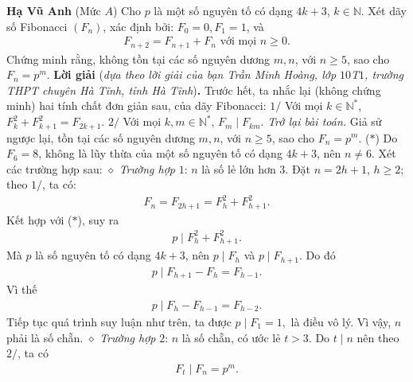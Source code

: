 \begin{multicols}{2}
	\vskip 0.2cm
	\hfill	\textbf{\color{thachthuctoanhoc}Hạ Vũ Anh}
	\vskip 0.2cm
	{}
	(Mức $A$)
	Cho $p$ là một số nguyên tố có dạng $4k + 3$, $k \in \mathbb{N}$. Xét dãy số Fibonacci $(F_n)$, xác định bởi: $F_0 = 0, F_1 = 1$,    và
	\begin{align*}
		{F_{n + 2}} = {F_{n + 1}} + {F_n}	\text{ với mọi } n \ge 0.
	\end{align*}
	Chứng minh rằng, không tồn tại các số nguyên dương $m, n$, với $n \ge 5$, sao cho \linebreak $F_n = p^m$.
	\vskip 0.05cm
	\textbf{\color{thachthuctoanhoc}Lời giải} (\textit{dựa theo lời giải của bạn Trần Minh Hoàng, lớp $10$T$1$, trường THPT chuyên Hà Tĩnh, tỉnh Hà Tĩnh})\textbf{\color{thachthuctoanhoc}.}
	\vskip 0.05cm
	Trước hết, ta nhắc lại (không chứng minh) hai tính chất đơn giản sau, của dãy Fibonacci:
	\vskip 0.05cm
	$1/$ Với mọi  $k \in \mathbb{N^*}$, $F_k^2 + F_{k + 1}^2 = {F_{2k + 1}}.$
	\vskip 0.05cm
	$2/$ Với mọi $k, m \in \mathbb{N^*}$, ${F_m}\mid{F_{km}}.$
	\vskip 0.05cm
	\textit{Trở lại bài toán.}
	\vskip 0.05cm
	Giả sử ngược lại, tồn tại các số nguyên dương $m, n$, với $n \ge 5$, sao cho  $F_n = p^m$. \hfill ($*$)
	\vskip 0.05cm
	Do $F_6 = 8$, không là lũy thừa của một số nguyên tố có dạng $4k + 3$, nên $n \ne 6$.
	\vskip 0.05cm
	Xét các trường hợp sau:
	\vskip 0.05cm
	$\diamond$ \textit{Trường hợp} $1$: $n$ là số lẻ lớn hơn $3$.
	\vskip 0.05cm
	Đặt $n = 2h + 1$, $h \ge 2$; theo $1/$, ta có:
	\begin{align*}
		{F_n} = {F_{2h + 1}} = F_h^2 + F_{h + 1}^2.
	\end{align*}
	Kết hợp với ($*$), suy ra
	\begin{align*}
		p\mid F_h^2 + F_{h + 1}^2.
	\end{align*}
	Mà $p$ là số nguyên tố có dạng $4k + 3$, nên $p\mid {F_h}$ và $p\mid {F_{h + 1}}$.  Do đó
	\begin{align*}
		p\mid{F_{h + 1}} - {F_h} = {F_{h - 1}}.
	\end{align*}
	Vì thế
	\begin{align*}
		p\mid{F_h} - {F_{h - 1}} = {F_{h - 2}}.
	\end{align*}
	Tiếp tục quá trình suy luận như trên, ta được $p\mid{F_1} = 1,$  là điều vô lý. Vì vậy, $n$ phải là số chẵn.
	\vskip 0.05cm
	$\diamond$ \textit{Trường hợp} $2$: $n$ là số chẵn, có ước lẻ $t > 3$.
	\vskip 0.05cm
	Do $t \mid n $  nên theo $2/$, ta có
	\begin{align*}
		{F_t}\mid{F_n} = {p^m}. 
	\end{align*}

\end{multicols}
